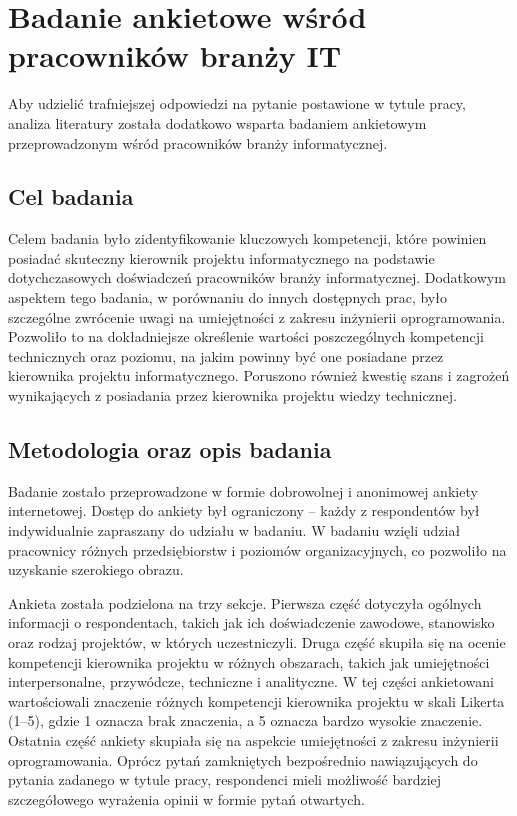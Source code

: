 \newpage

\section{Badanie ankietowe wśród pracowników branży IT}
Aby udzielić trafniejszej odpowiedzi na pytanie postawione w tytule pracy, analiza literatury została dodatkowo wsparta badaniem ankietowym przeprowadzonym wśród pracowników branży informatycznej.

\subsection{Cel badania}
Celem badania było zidentyfikowanie kluczowych kompetencji, które powinien posiadać skuteczny kierownik projektu informatycznego na podstawie dotychczasowych doświadczeń pracowników branży informatycznej. Dodatkowym aspektem tego badania, w porównaniu do innych dostępnych prac, było szczególne zwrócenie uwagi na umiejętności z zakresu inżynierii oprogramowania. Pozwoliło to na dokładniejsze określenie wartości poszczególnych kompetencji technicznych oraz poziomu, na jakim powinny być one posiadane przez kierownika projektu informatycznego. Poruszono również kwestię szans i zagrożeń wynikających z posiadania przez kierownika projektu wiedzy technicznej.

\subsection{Metodologia oraz opis badania}
Badanie zostało przeprowadzone w formie dobrowolnej i anonimowej ankiety internetowej. Dostęp do ankiety był ograniczony – każdy z respondentów był indywidualnie zapraszany do udziału w badaniu. W badaniu wzięli udział pracownicy różnych przedsiębiorstw i poziomów organizacyjnych, co pozwoliło na uzyskanie szerokiego obrazu.

Ankieta została podzielona na trzy sekcje. Pierwsza część dotyczyła ogólnych informacji o respondentach, takich jak ich doświadczenie zawodowe, stanowisko oraz rodzaj projektów, w których uczestniczyli. Druga część skupiła się na ocenie kompetencji kierownika projektu w różnych obszarach, takich jak umiejętności interpersonalne, przywódcze, techniczne i analityczne. W tej części ankietowani wartościowali znaczenie różnych kompetencji kierownika projektu w skali Likerta (1–5), gdzie 1 oznacza brak znaczenia, a 5 oznacza bardzo wysokie znaczenie. Ostatnia część ankiety skupiała się na aspekcie umiejętności z zakresu inżynierii oprogramowania. Oprócz pytań zamkniętych bezpośrednio nawiązujących do pytania zadanego w tytule pracy, respondenci mieli możliwość bardziej szczegółowego wyrażenia opinii w formie pytań otwartych.

